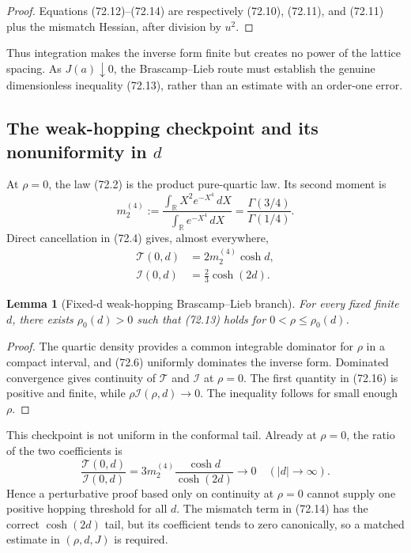 \documentclass[11pt]{article}
\newtheorem{lemma}[theorem]{Lemma}
\theoremstyle{remark}
\begin{document}
\begin{proof}
Equations (72.12)--(72.14) are respectively (72.10), (72.11), and
(72.11) plus the mismatch Hessian, after division by \(u^2\).
\end{proof}

Thus integration makes the inverse form finite but creates no power of
the lattice spacing.  As \(J(a)\downarrow0\), the Brascamp--Lieb route
must establish the genuine dimensionless inequality (72.13), rather
than an estimate with an order-one error.

\subsection{The weak-hopping checkpoint and its nonuniformity in \(d\)}

At \(\rho=0\), the law (72.2) is the product pure-quartic law.  Its
second moment is
\[
 m_2^{(4)}
 :=\frac{\int_{\mathbb R}X^2e^{-X^4}\,dX}
         {\int_{\mathbb R}e^{-X^4}\,dX}
 =\frac{\Gamma(3/4)}{\Gamma(1/4)}.                \tag{72.15}
\]
Direct cancellation in (72.4) gives, almost everywhere,
\[
\begin{aligned}
 \mathcal T(0,d)&=2m_2^{(4)}\cosh d,\\
 \mathcal I(0,d)&=\frac23\cosh(2d).              \tag{72.16}
\end{aligned}
\]

\begin{lemma}[Fixed-d weak-hopping Brascamp--Lieb branch]
\label{lem:v17v72-weak}
For every fixed finite \(d\), there exists
\(\rho_0(d)>0\) such that (72.13) holds for
\(0<\rho\leq\rho_0(d)\).
\end{lemma}

\begin{proof}
The quartic density provides a common integrable dominator for \(\rho\)
in a compact interval, and (72.6) uniformly dominates the inverse
form.  Dominated convergence gives continuity of
\(\mathcal T\) and \(\mathcal I\) at \(\rho=0\).  The first quantity in
(72.16) is positive and finite, while
\(\rho\mathcal I(\rho,d)\to0\).  The inequality follows for small
enough \(\rho\).
\end{proof}

This checkpoint is not uniform in the conformal tail.  Already at
\(\rho=0\), the ratio of the two coefficients is
\[
 \frac{\mathcal T(0,d)}{\mathcal I(0,d)}
 =3m_2^{(4)}\frac{\cosh d}{\cosh(2d)}
 \longrightarrow0
 \quad (|d|\to\infty).                            \tag{72.17}
\]
Hence a perturbative proof based only on continuity at \(\rho=0\)
cannot supply one positive hopping threshold for all \(d\).  The
mismatch term in (72.14) has the correct \(\cosh(2d)\) tail, but its
coefficient tends to zero canonically, so a matched estimate in
\((\rho,d,J)\) is required.
\end{document}
